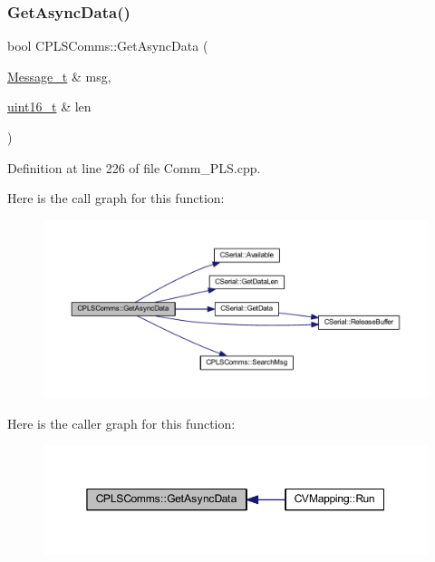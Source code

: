 \subsubsection{\texorpdfstring{Get\+Async\+Data()}{GetAsyncData()}}
{\footnotesize\ttfamily bool C\+P\+L\+S\+Comms\+::\+Get\+Async\+Data (\begin{DoxyParamCaption}\item[{\mbox{\hyperlink{struct_c_p_l_s_comms_1_1_message__t}{Message\+\_\+t}} \&}]{msg,  }\item[{\mbox{\hyperlink{_a_d_a_s___types_8h_a1f1825b69244eb3ad2c7165ddc99c956}{uint16\+\_\+t}} \&}]{len }\end{DoxyParamCaption})}



Definition at line 226 of file Comm\+\_\+\+P\+L\+S.\+cpp.

Here is the call graph for this function\+:\nopagebreak
\begin{figure}[H]
\begin{center}
\leavevmode
\includegraphics[width=350pt]{class_c_p_l_s_comms_a3124eaa4549706962c7024c7c97e82b0_cgraph}
\end{center}
\end{figure}
Here is the caller graph for this function\+:\nopagebreak
\begin{figure}[H]
\begin{center}
\leavevmode
\includegraphics[width=350pt]{class_c_p_l_s_comms_a3124eaa4549706962c7024c7c97e82b0_icgraph}
\end{center}
\end{figure}
\mbox{\label{class_c_p_l_s_comms_a05149da99ab80b804699763111315f33}} 
